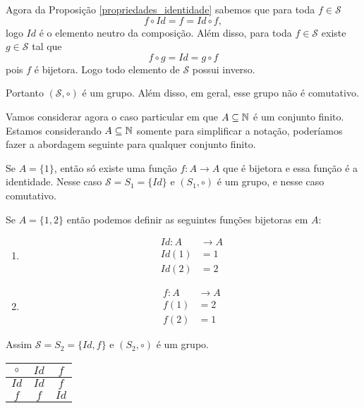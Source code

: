Agora da Proposição \ref{propriedades_identidade} sabemos que para toda $f \in \mathcal{S}$
\[
    f\circ Id = f = Id\circ f,
\]
logo $Id$ é o elemento neutro da composição. Além disso, para toda $f \in \mathcal{S}$ existe $g \in \mathcal{S}$ tal que
\[
    f\circ g = Id = g \circ f
\]
pois $f$ é bijetora. Logo todo elemento de $\mathcal{S}$ possui inverso.

Portanto $(\mathcal{S}, \circ)$ é um grupo. Além disso, em geral, esse grupo não é comutativo.

Vamos considerar agora o caso particular em que $A \subseteq \mathbb{N}$ é um conjunto finito. Estamos considerando $A \subseteq \mathbb{N}$ somente para simplificar a notação, poderíamos fazer a abordagem seguinte para qualquer conjunto finito.

Se $A = \{1\}$, então só existe uma função $f : A \to A$ que é bijetora e essa função é a identidade. Nesse caso $\mathcal{S} = S_1 = \{Id\}$ e $(S_1, \circ)$ é um grupo, e nesse caso comutativo.


Se $A = \{1, 2\}$ então podemos definir as seguintes funções bijetoras em $A$:
\begin{multicols}{2}
    \begin{enumerate}
        \item[] \begin{align*}
            Id : A &\to A\\ Id(1) &= 1\\ Id(2) &= 2
        \end{align*}
        \item[]  \begin{align*}
            f : A &\to A\\ f(1) &= 2\\ f(2) &= 1
        \end{align*}
    \end{enumerate}
\end{multicols}

Assim $\mathcal{S} = S_2 = \{Id, f\}$ e $(S_2, \circ)$ é um grupo.
\begin{table}[!htb]
\centering
    \begin{tabular}{|c|c|c|}
        \hline
        $\circ$ & $Id$ & $f$\T\\
        \hline
        $Id$ & $Id$ & $f$\T\\
        \hline
        $f$ & $f$ & $Id$\T\\
        \hline
    \end{tabular}
\end{table}

